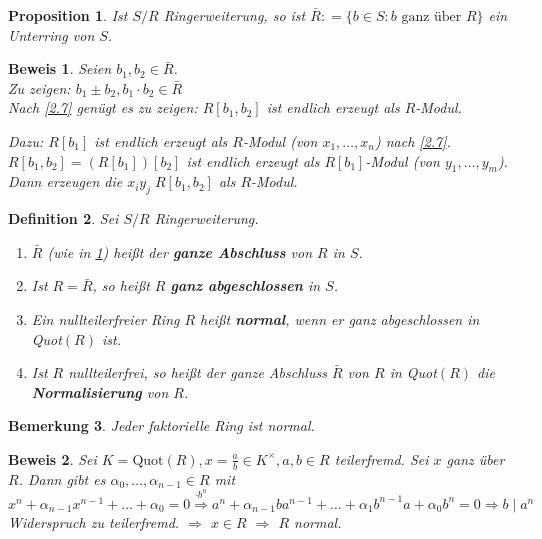 \documentclass[a4paper,12pt]{scrbook}
\theoremstyle{break}
\newtheorem{Def}{Definition}[chapter]
\newtheorem{Bem}[Def]{Bemerkung}
\newtheorem{Prop}[Def]{Proposition}
\theoremstyle{nonumberbreak}
\newtheorem{Bew}{Beweis}
\theoremstyle{nonumberplain}
\newcommand{\emp}[1]{\textbf{\emph{#1}}}
\newcommand{\defeqr}[0]{\mathrel{\mathop:}=}
\begin{document}
\begin{Prop}
\label{2.8}
  Ist $S/R$ Ringerweiterung, so ist $\bar{R} \defeqr \{ b \in S: b \text{ ganz 
  über } R \}$ ein Unterring von $S$.
\end{Prop}

\begin{Bew} 
  Seien $b_1, b_2 \in \bar{R}$.\\
  Zu zeigen: $b_1 \pm b_2, b_1 \cdot b_2 \in \bar{R}$\\
  Nach \ref{2.7} genügt es zu zeigen: $R[b_1, b_2]$ ist endlich erzeugt als
  $R$-Modul.

  Dazu: $R[b_1]$ ist endlich erzeugt als $R$-Modul (von $x_1, \dots, x_n$) nach
  \ref{2.7}.  $R[b_1, b_2] = (R[b_1])[b_2]$ ist endlich erzeugt als
  $R[b_1]$-Modul (von $y_1, \dots, y_m$).  Dann erzeugen die $x_i y_j \; R[b_1,
  b_2]$ als $R$-Modul.
\end{Bew}

\begin{Def} 
  Sei $S/R$ Ringerweiterung.
  \begin{enumerate} 
    \item $\bar{R}$ (wie in \ref{2.8}) heißt der \emp{ganze
          Abschluss} von $R$ in $S$.
    \item Ist $R = \bar{R}$, so heißt $R$ \emp{ganz
          abgeschlossen} in $S$.
    \item Ein nullteilerfreier Ring $R$ heißt \emp{normal}, wenn er ganz
          abgeschlossen in Quot$(R)$ ist.
    \item Ist $R$ nullteilerfrei, so heißt der ganze Abschluss $\bar{R}$ von $R$
          in Quot$(R)$ die \emp{Normalisierung} von $R$.
  \end{enumerate}
\end{Def}

\begin{Bem}
\label{2.10}
  Jeder faktorielle Ring ist normal.
\end{Bem}

\begin{Bew} 
  Sei $K=\mbox{Quot}(R), x= \frac{a}{b} \in K^\times, a,b \in R$ teilerfremd.
  Sei $x$ ganz über $R$. Dann gibt es $\alpha_0, \dots, \alpha_{n-1} \in R$ mit
  $x^n + \alpha_{n-1} x^{n-1} + \dots + \alpha_0 = 0 \overset{\cdot b^n}{\Rightarrow}
  a^n + \alpha_{n-1} b a^{n-1} + \dots + \alpha_1 b^{n-1} a + \alpha_0 b^n = 0
  \Rightarrow b \mid a^n$ Widerspruch zu teilerfremd. $\Rightarrow$ $x \in R$ $\Rightarrow$ $R$ normal.
\end{Bew}
\end{document}
